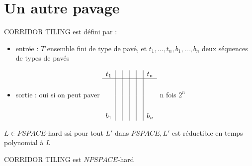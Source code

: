 \documentclass[10pt,a4paper]{article}
\begin{document}
\section{Un autre pavage}
CORRIDOR TILING est défini par :
\begin{itemize}
\item entrée : $T$ ensemble fini de type de pavé, et $t_1, ..., t_n, b_1, ..., b_n$ deux séquences de types de pavés
\item sortie : oui si on peut paver 
$\begin{array}{c| c| c | c | c | c}
t_1 & & & & & t_n\\
 \hline
& & & & & \\
& & & & & \\
& & & & & \\
& & & & & \\
b_1 & & & & & b_n
\end{array}$ n fois $2^n$
\end{itemize}

\begin{definition}{}$L \in PSPACE$-hard ssi pour tout $L'$ dans $PSPACE, L'$ est réductible en temps polynomial à $L$
\end{definition}
\begin{thm}
 CORRIDOR TILING est $NPSPACE$-hard
\end{thm}
\end{document}
